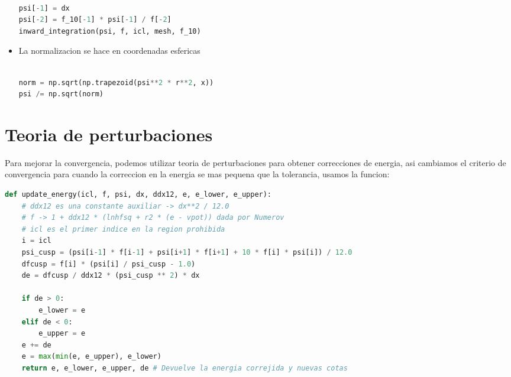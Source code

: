 \documentclass[11pt]{article}
\begin{document}
\begin{itemize}
\begin{lstlisting}[language=Python,numbers=none]

psi[-1] = dx
psi[-2] = f_10[-1] * psi[-1] / f[-2]
inward_integration(psi, f, icl, mesh, f_10)

\end{lstlisting}

\item La normalizacion se hace en coordenadas esfericas

\begin{lstlisting}[language=Python,numbers=none]

norm = np.sqrt(np.trapezoid(psi**2 * r**2, x))  
psi /= np.sqrt(norm)

\end{lstlisting}
\end{itemize}
\section{Teoria de perturbaciones}
\label{sec:org52ec7a4}

Para mejorar la convergencia, podemos utilizar teoria de perturbaciones para obtener correcciones de energia, asi cambiamos el criterio de convergencia para cuando la correccion en la energia se mas pequena que la tolerancia, usamos la funcion:

\begin{lstlisting}[language=Python,numbers=none]
def update_energy(icl, f, psi, dx, ddx12, e, e_lower, e_upper):
    # ddx12 es una constante auxiliar -> dx**2 / 12.0
    # f -> 1 + ddx12 * (lnhfsq + r2 * (e - vpot)) dada por Numerov
    # icl es el primer indice en la region prohibida
    i = icl
    psi_cusp = (psi[i-1] * f[i-1] + psi[i+1] * f[i+1] + 10 * f[i] * psi[i]) / 12.0
    dfcusp = f[i] * (psi[i] / psi_cusp - 1.0)
    de = dfcusp / ddx12 * (psi_cusp ** 2) * dx

    if de > 0:
        e_lower = e
    elif de < 0:
        e_upper = e
    e += de
    e = max(min(e, e_upper), e_lower)
    return e, e_lower, e_upper, de # Devuelve la energia correjida y nuevas cotas
\end{lstlisting}
\end{document}
